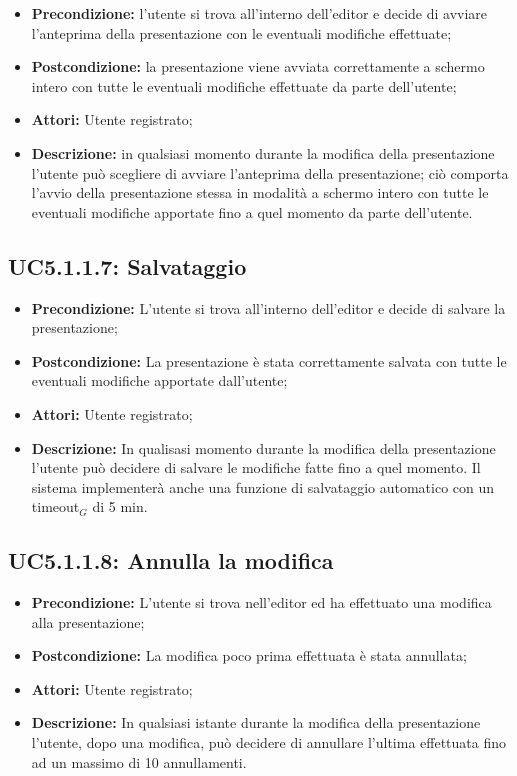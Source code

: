 \begin{itemize}
	\item \textbf{Precondizione:} l’utente si trova all’interno dell’editor e decide di avviare l’anteprima della presentazione con le eventuali modifiche effettuate;
	\item \textbf{Postcondizione:} la presentazione viene avviata correttamente a schermo intero con tutte le eventuali modifiche effettuate da parte dell’utente;
	\item \textbf{Attori:} Utente registrato;
	\item \textbf{Descrizione:} in qualsiasi momento durante la modifica della presentazione l’utente può scegliere di avviare l’anteprima della presentazione; ciò comporta l’avvio della presentazione stessa in modalità a schermo intero con tutte le eventuali modifiche apportate fino a quel momento da parte dell’utente.
\end{itemize}
\subsection{ UC5.1.1.7: Salvataggio}

\begin{itemize}
	\item \textbf{Precondizione:} L’utente si trova all’interno dell’editor e decide di salvare la presentazione;
	\item \textbf{Postcondizione:} La presentazione è stata correttamente salvata con tutte le eventuali modifiche apportate dall’utente;
	\item \textbf{Attori:} Utente registrato;
	\item \textbf{Descrizione:} In qualisasi momento durante la modifica della presentazione l’utente può decidere di salvare le modifiche fatte fino a quel momento. Il sistema implementerà anche una funzione di salvataggio automatico con un timeout$_G$ di 5 min.
\end{itemize}
\subsection{ UC5.1.1.8: Annulla la modifica}

\begin{itemize}
	\item \textbf{Precondizione:} L’utente si trova nell’editor ed ha effettuato una modifica alla presentazione;
	\item \textbf{Postcondizione:} La modifica poco prima effettuata è stata annullata;
	\item \textbf{Attori:} Utente registrato;
	\item \textbf{Descrizione:} In qualsiasi istante durante la modifica della presentazione l’utente, dopo una modifica, può decidere di annullare l’ultima effettuata fino ad un massimo di 10 annullamenti.
\end{itemize}

